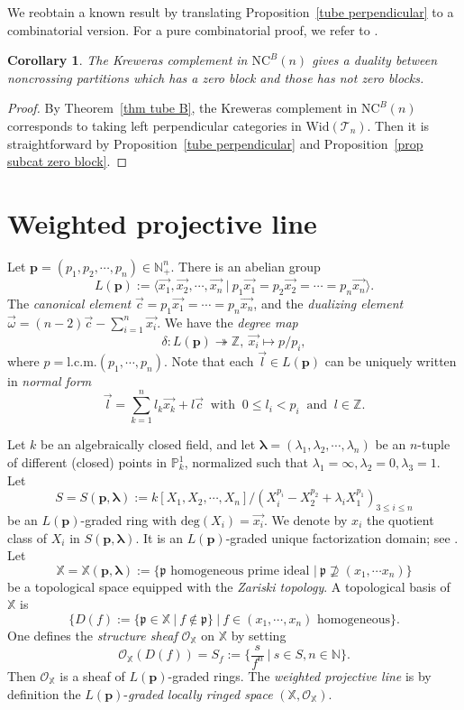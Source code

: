 \documentclass[a4paper, 11pt, reqno]{amsart}
\numberwithin{equation}{section}
\newtheorem{cor}[thm]{Corollary}
\theoremstyle{remark}
\theoremstyle{definition}
\begin{document}
We reobtain a known result by translating Proposition~\ref{tube perpendicular} to a combinatorial version. For a pure combinatorial proof, we refer to \cite[section~1.2]{biane2003non}.

\begin{cor}
   The Kreweras complement in $\mathrm{NC}^B(n)$ gives a duality between noncrossing partitions which has a zero block and those has not zero blocks.
\end{cor}

\begin{proof}
   By Theorem~\ref{thm tube B}, the Kreweras complement in $\mathrm{NC}^B(n)$ corresponds to taking left perpendicular categories in $\mathrm{Wid}(\mathcal T_n)$. Then it is straightforward by Proposition~\ref{tube perpendicular} and Proposition~\ref{prop subcat zero block}.
\end{proof}


\section{Weighted projective line}

Let $\bm p=(p_1,p_2,\cdots,p_n)\in \mathbb N_+^n$. There is an abelian group
\[
L(\bm p):=\langle\vec{x_1},\vec{x_2},\cdots,\vec{x_n} \ | \ p_1\vec{x_1}=p_2\vec{x_2}=\cdots=p_n\vec{x_n}\rangle.
\]
The \emph{canonical element} $\vec{c}=p_1\vec{x_1}=\cdots =p_n \vec{x_n}$, and the \emph{dualizing element} $\vec{\omega}=(n-2)\vec{c}-\sum_{i=1}^n\vec{x_i}$. We have the \emph{degree map}
\[
\delta: L(\bm p)\twoheadrightarrow \mathbb Z, \ \vec{x_i}\mapsto p/p_i,
\]
where $p=\mathrm{l.c.m.}(p_1,\cdots,p_n)$. Note that each $\vec l \in L(\bm p)$ can be uniquely written in \emph{normal form}
\[
   \vec l =\sum_{k=1}^n l_k \vec{x_k}+l \vec c \ \text{  with  }\  0 \leq l_i <p_i \ \text{  and  }\  l \in \mathbb Z.
\]

Let $k$ be an algebraically closed field, and let $\bm \lambda=(\lambda_1, \lambda_2, \cdots, \lambda_n)$ be an $n$-tuple of different (closed) points in $\mathbb P^{1}_k$, normalized such that $\lambda_1=\infty, \lambda_2=0, \lambda_3=1$. Let
\[
S=S(\bm p, \bm{\lambda}):=k[X_1,X_2,\cdots,X_n]/(X_i^{p_i}-X_2^{p_2}+\lambda_i X_1^{p_1})_{3 \leq i \leq n}
\]
be an $L(\bm p)$-graded ring with $\mathrm{deg}(X_i)=\vec{x_i}$. We denote by $x_i$ the quotient class of $X_i$ in $S(\bm p, \bm \lambda)$. It is an $L(\bm p)$-graded unique factorization domain; see \cite[Proposition~1.3]{geigle1987class}. Let
\[
   \mathbb X=\mathbb X(\bm p, \bm \lambda):=\{\mathfrak{p} \text{ homogeneous prime ideal } | \ \mathfrak{p} \nsupseteq (x_1, \cdots x_n)\}
\]
be a topological space equipped with the \emph{Zariski topology}. A topological basis of $\mathbb X$ is
\[
   \{D(f):=\{\mathfrak{p} \in \mathbb X \ | \ f \notin \mathfrak{p}\} \ | \ f \in (x_1, \cdots , x_n) \text{ homogeneous}\}.
\]
One defines the \emph{structure sheaf} $\mathcal O_{\mathbb X}$ on $\mathbb X$ by setting  
\[
   \mathcal O_{\mathbb X}(D(f))=S_f:=\{ \frac{s}{f^n} \ | \ s \in S, n \in \mathbb N \}.
\]
Then $\mathcal O_{\mathbb X}$ is a sheaf of $L(\bm p)$-graded rings. The \emph{weighted projective line} is by definition the $L(\bm p)$-\emph{graded locally ringed space} $(\mathbb X, \mathcal O_{\mathbb X})$. 
\end{document}
